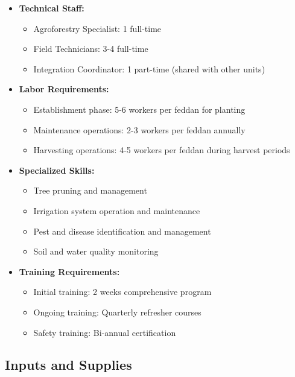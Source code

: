 \begin{itemize}
    \item \textbf{Technical Staff:}
    \begin{itemize}
        \item Agroforestry Specialist: 1 full-time
        \item Field Technicians: 3-4 full-time
        \item Integration Coordinator: 1 part-time (shared with other units)
    \end{itemize}
    \item \textbf{Labor Requirements:}
    \begin{itemize}
        \item Establishment phase: 5-6 workers per feddan for planting
        \item Maintenance operations: 2-3 workers per feddan annually
        \item Harvesting operations: 4-5 workers per feddan during harvest periods
    \end{itemize}
    \item \textbf{Specialized Skills:}
    \begin{itemize}
        \item Tree pruning and management
        \item Irrigation system operation and maintenance
        \item Pest and disease identification and management
        \item Soil and water quality monitoring
    \end{itemize}
    \item \textbf{Training Requirements:}
    \begin{itemize}
        \item Initial training: 2 weeks comprehensive program
        \item Ongoing training: Quarterly refresher courses
        \item Safety training: Bi-annual certification
    \end{itemize}
\end{itemize}

\subsection{Inputs and Supplies}

